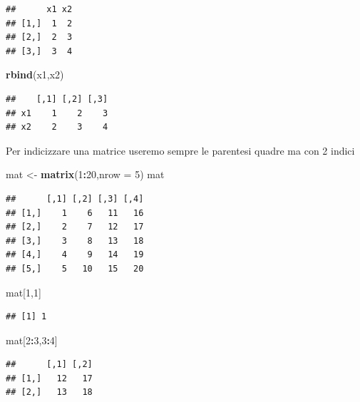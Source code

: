 \documentclass[
  11pt,
]{book}
\newenvironment{Shaded}{\begin{snugshade}}{\end{snugshade}}
\newcommand{\AttributeTok}[1]{\textcolor[rgb]{0.13,0.29,0.53}{#1}}
\newcommand{\DecValTok}[1]{\textcolor[rgb]{0.00,0.00,0.81}{#1}}
\newcommand{\FunctionTok}[1]{\textcolor[rgb]{0.13,0.29,0.53}{\textbf{#1}}}
\newcommand{\NormalTok}[1]{#1}
\newcommand{\OtherTok}[1]{\textcolor[rgb]{0.56,0.35,0.01}{#1}}
\newcommand{\SpecialCharTok}[1]{\textcolor[rgb]{0.81,0.36,0.00}{\textbf{#1}}}
\theoremstyle{mytheoremstyle}
\theoremstyle{mydefstyle}
\begin{document}
\begin{verbatim}
##      x1 x2
## [1,]  1  2
## [2,]  2  3
## [3,]  3  4
\end{verbatim}

\begin{Shaded}
\begin{Highlighting}[]
\FunctionTok{rbind}\NormalTok{(x1,x2)}
\end{Highlighting}
\end{Shaded}

\begin{verbatim}
##    [,1] [,2] [,3]
## x1    1    2    3
## x2    2    3    4
\end{verbatim}

Per indicizzare una matrice useremo sempre le parentesi quadre ma con 2 indici

\begin{Shaded}
\begin{Highlighting}[]
\NormalTok{mat }\OtherTok{\textless{}{-}} \FunctionTok{matrix}\NormalTok{(}\DecValTok{1}\SpecialCharTok{:}\DecValTok{20}\NormalTok{,}\AttributeTok{nrow =} \DecValTok{5}\NormalTok{) }
\NormalTok{mat}
\end{Highlighting}
\end{Shaded}

\begin{verbatim}
##      [,1] [,2] [,3] [,4]
## [1,]    1    6   11   16
## [2,]    2    7   12   17
## [3,]    3    8   13   18
## [4,]    4    9   14   19
## [5,]    5   10   15   20
\end{verbatim}

\begin{Shaded}
\begin{Highlighting}[]
\NormalTok{mat[}\DecValTok{1}\NormalTok{,}\DecValTok{1}\NormalTok{]}
\end{Highlighting}
\end{Shaded}

\begin{verbatim}
## [1] 1
\end{verbatim}

\begin{Shaded}
\begin{Highlighting}[]
\NormalTok{mat[}\DecValTok{2}\SpecialCharTok{:}\DecValTok{3}\NormalTok{,}\DecValTok{3}\SpecialCharTok{:}\DecValTok{4}\NormalTok{]}
\end{Highlighting}
\end{Shaded}

\begin{verbatim}
##      [,1] [,2]
## [1,]   12   17
## [2,]   13   18
\end{verbatim}
\end{document}

